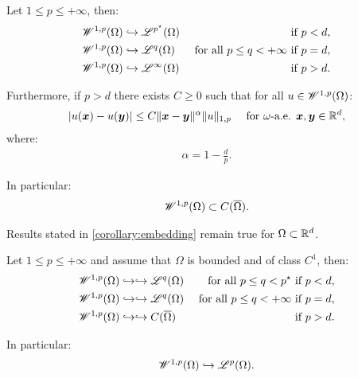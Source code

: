 \begin{corollary}
    Let $1 \leq p \leq +\infty$, then:
    \begin{align}
        \mathscr{W}^{1, p}(\Omega) & \hookrightarrow \mathscr{L}^{p^{\star}}(\Omega) & \text{ if } p < d, \\
        \mathscr{W}^{1, p}(\Omega) & \hookrightarrow \mathscr{L}^{q}(\Omega) &\text{ for all } p \leq q < +\infty \text{ if } p = d, \\
        \mathscr{W}^{1, p}(\Omega) & \hookrightarrow \mathscr{L}^{\infty}(\Omega) & \text{ if } p > d.
    \end{align}

    Furthermore, if $p > d$ there exists $C \geq 0$ such that for all $u \in \mathscr{W}^{1, p}(\Omega)$:
    \begin{align}
        \lvert u(\bm{x}) - u(\bm{y}) \rvert &\leq C \lVert \bm{x} - \bm{y} \rVert^{\alpha} \lVert u \rVert_{1, p} &\text{ for } \omega \text{-a.e. } \bm{x}, \bm{y} \in \mathbb{R}^{d},
    \end{align}
    where:
    \begin{align}
        \alpha = 1 - \frac{d}{p}.
    \end{align}

    In particular:
    \begin{align}
        \mathscr{W}^{1, p}(\Omega) \subset C(\overline{\Omega}).
    \end{align}
\end{corollary}

\begin{corollary}
    Results stated in \cref{corollary:embedding} remain true for $\Omega \subset \mathbb{R}^{d}$.
\end{corollary}

\begin{theorem}
    Let $1 \leq p \leq +\infty$ and assume that $\Omega$ is bounded and of class $C^1$, then:
    \begin{align}
        \mathscr{W}^{1, p}(\Omega) & \hookrightarrow \hookrightarrow \mathscr{L}^{q}(\Omega) &\text{ for all } p \leq q < p^{\star} \text{ if } p < d, \\
        \mathscr{W}^{1, p}(\Omega) & \hookrightarrow \hookrightarrow \mathscr{L}^{q}(\Omega) &\text{ for all } p \leq q < +\infty \text{ if } p = d, \\
        \mathscr{W}^{1, p}(\Omega) & \hookrightarrow \hookrightarrow C(\overline{\Omega}) & \text{ if } p > d.
    \end{align}

    In particular:
    \begin{align}
        \mathscr{W}^{1, p}(\Omega) \hookrightarrow \mathscr{L}^{p}(\Omega).
    \end{align}
\end{theorem}

